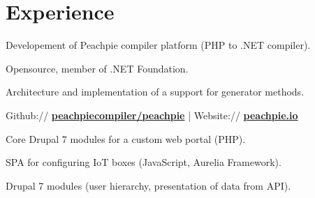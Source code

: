 \documentclass[a4paper]{deedy-resume} %
\begin{document}
%
\begin{minipage}[t]{0.66\textwidth} %


\section{Experience}


\vspace{\topsep} %
\begin{tightitemize}
\item Developement of Peachpie compiler platform (PHP to .NET compiler).
\item Opensource, member of .NET Foundation.
\item Architecture and implementation of a support for generator methods.
\item Github:// \href{https://github.com/peachpiecompiler/peachpie}{\bf peachpiecompiler/peachpie} | Website:// \href{https://www.peachpie.io/}{\bf peachpie.io}
\end{tightitemize}

\sectionspace %



\begin{tightitemize}
\item Core Drupal 7 modules for a custom web portal (PHP).
\item SPA for configuring IoT boxes (JavaScript, Aurelia Framework).
\end{tightitemize}

\begin{tightitemize}
\item Drupal 7 modules (user hierarchy, presentation of data from API).
\end{tightitemize}

\sectionspace %



\end{minipage}
\end{document}
